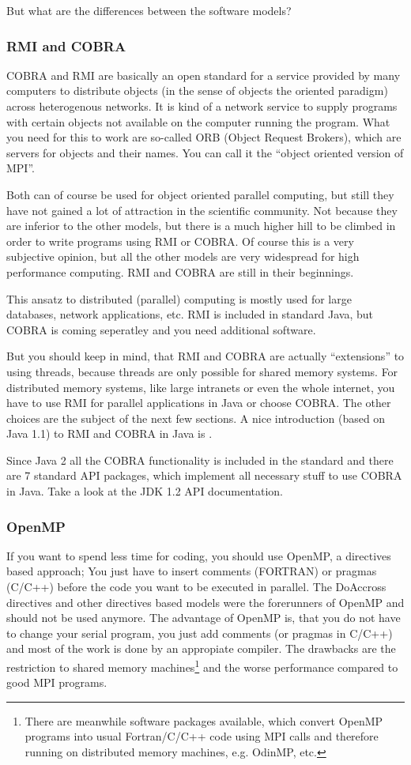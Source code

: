 But what are the differences between the software models?
\subsubsection{RMI and COBRA}
COBRA and RMI are basically an open standard for a service
provided by many computers to distribute objects (in the sense of objects
the oriented paradigm) across heterogenous networks. It is kind of a
network service to supply programs with certain objects not available
on the computer running the program. What you need for this to work are
so-called ORB (Object Request Brokers), which are servers for objects and
their names. You can call it the ``object oriented version of MPI''.

Both can of course be used for object oriented parallel computing, but
still they have not gained a lot of attraction in the scientific
community. Not because they are inferior to the other models, but there
is a much higher hill to be climbed in order to write programs using 
RMI or COBRA. Of course this is a very subjective opinion, but all the
other models are very widespread for high performance computing. RMI and
COBRA are still in their beginnings. 

This ansatz to distributed (parallel) computing is mostly used for 
large databases, network applications, etc. RMI is included in standard 
Java, but COBRA is coming seperatley and you need additional software.

But you should keep in mind, that RMI and COBRA are actually ``extensions''
to using threads, because threads are only possible for shared memory
systems. For distributed memory systems, like large intranets or even the
whole internet, you have to use RMI for parallel applications in Java or
choose COBRA. The other choices are the subject of the next few sections.
A nice introduction (based on Java 1.1) 
to RMI and COBRA in Java is \cite[]{DistributedComputing}.

Since Java 2 all the COBRA functionality is included in the
standard and there are 7 standard API packages, which implement
all necessary stuff to use COBRA in Java. Take a look at the 
JDK 1.2 API documentation.



\subsubsection{OpenMP}
If you want to spend
less time for coding, you should use OpenMP, a directives based approach;
You just have to insert comments (FORTRAN) or pragmas (C/C++) before the 
code you want to be executed in parallel.
The DoAccross directives and other directives based models were the
forerunners of OpenMP and should not be used anymore. The advantage of OpenMP is,
that you do not have to change your serial program, you just add comments
(or pragmas in C/C++) and most of the work is done by an appropiate compiler.
The drawbacks are the restriction to shared memory machines\footnote{There are
meanwhile software packages available, which convert OpenMP programs into 
usual Fortran/C/C++ code using MPI calls and therefore running on
distributed memory machines, e.g. OdinMP, etc.}
and the worse performance compared to good MPI programs.

